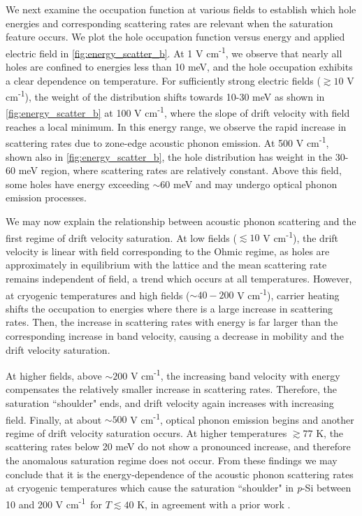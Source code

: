 \documentclass[aps,prx,preprint,letterpaper,groupedaddress,longbibliography]{revtex4-2}
\theoremstyle{definition}
\newcommand{\smalleunits}{V cm\textsuperscript{-1}}
\begin{document}
We next examine the occupation function at various fields to establish which hole energies and corresponding scattering rates are relevant when the saturation feature occurs. We plot the hole occupation function versus energy and applied electric field in \cref{fig:energy_scatter_b}. At 1 \smalleunits, we observe that nearly all holes are confined to energies less than 10 meV, and the hole occupation exhibits a clear dependence on temperature. For sufficiently strong electric fields ($\gtrsim 10$ \smalleunits), the weight of the distribution shifts towards 10-30 meV as shown in \cref{fig:energy_scatter_b} at 100 \smalleunits, where the slope of drift velocity with field reaches a local minimum. In this energy range, we observe the rapid increase in scattering rates due to zone-edge acoustic phonon emission. At 500 \smalleunits, shown also in \cref{fig:energy_scatter_b}, the hole distribution has weight in the 30-60 meV region, where scattering rates are relatively constant. Above this field, some holes have energy exceeding  $\sim 60$ meV and may undergo optical phonon emission processes.\par

We may now explain the relationship between acoustic phonon scattering and the first regime of drift velocity saturation. At low fields ($\lesssim 10$ \smalleunits), the drift velocity is linear with field corresponding to the Ohmic regime, as holes are approximately in equilibrium with the lattice and the mean scattering rate remains independent of field, a trend which occurs at all temperatures. However, at cryogenic temperatures and high fields ($\sim 40-200$ \smalleunits), carrier heating shifts the occupation to energies where there is a large increase in scattering rates. Then, the increase in scattering rates with energy is far larger than the corresponding increase in band velocity, causing a decrease in mobility and the drift velocity saturation.\par

At higher fields, above $\sim 200$ \smalleunits, the increasing band velocity with energy compensates the relatively smaller increase in scattering rates. Therefore, the saturation ``shoulder" ends, and drift velocity again increases with increasing field. Finally, at about $\sim 500$ \smalleunits, optical phonon emission begins and another regime of drift velocity saturation occurs. At higher temperatures $\gtrsim 77$ K, the scattering rates below 20 meV do not show a pronounced increase, and therefore the anomalous saturation regime does not occur. From these findings we may conclude that it is the energy-dependence of the acoustic phonon scattering rates at cryogenic temperatures which cause the saturation ``shoulder" in \textit{p}-Si between 10 and 200 \smalleunits~for $T\lesssim 40$ K, in agreement with a prior work \cite{VonB:1976}.
\end{document}
